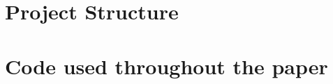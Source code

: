 \newpage
\appendix
\section{Project Structure}
\section{Code used throughout the paper}
\label{appendix:a}
%
